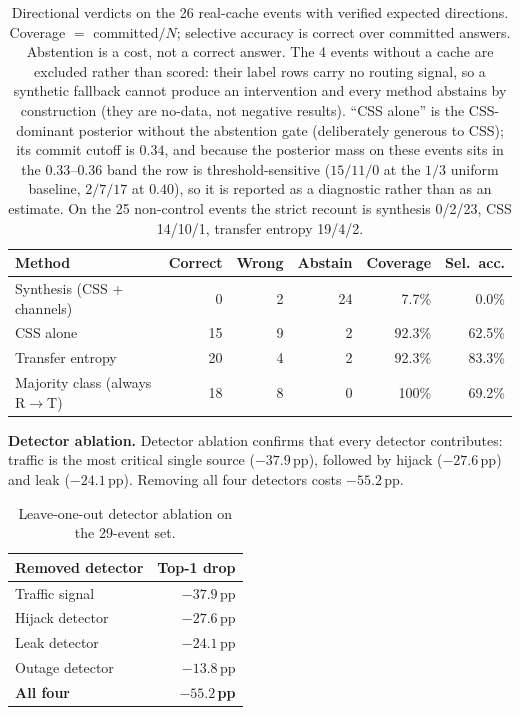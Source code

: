 \begin{table}[t]
\centering
\caption{Directional verdicts on the 26 real-cache events with verified expected directions. Coverage $=$ committed$/N$; selective accuracy is correct over committed answers. Abstention is a cost, not a correct answer. The 4 events without a cache are excluded rather than scored: their label rows carry no routing signal, so a synthetic fallback cannot produce an intervention and every method abstains by construction (they are no-data, not negative results). ``CSS alone'' is the CSS-dominant posterior without the abstention gate (deliberately generous to CSS); its commit cutoff is $0.34$, and because the posterior mass on these events sits in the $0.33$--$0.36$ band the row is threshold-sensitive ($15/11/0$ at the $1/3$ uniform baseline, $2/7/17$ at $0.40$), so it is reported as a diagnostic rather than as an estimate. On the 25 non-control events the strict recount is synthesis 0/2/23, CSS 14/10/1, transfer entropy 19/4/2.}
\label{tab:hcaf-4way}
\small
\begin{tabular}{l r r r r r}
\hline
\textbf{Method} & \textbf{Correct} & \textbf{Wrong} & \textbf{Abstain} & \textbf{Coverage} & \textbf{Sel.\ acc.} \\
\hline
Synthesis (CSS + channels) & 0  & 2 & 24 & 7.7\%  & 0.0\% \\
CSS alone                  & 15 & 9 & 2  & 92.3\% & 62.5\% \\
Transfer entropy           & 20 & 4 & 2  & 92.3\% & 83.3\% \\
Majority class (always R$\to$T) & 18 & 8 & 0 & 100\% & 69.2\% \\
\hline
\end{tabular}
\end{table}

\textbf{Detector ablation.} Detector ablation confirms that every detector contributes: traffic is the most critical single source ($-37.9$\,pp), followed by hijack ($-27.6$\,pp) and leak ($-24.1$\,pp). Removing all four detectors costs $-55.2$\,pp.

\begin{table}[t]
\centering
\caption{Leave-one-out detector ablation on the 29-event set.}
\label{tab:ablation}
\small
\begin{tabular}{l r}
\hline
\textbf{Removed detector} & \textbf{Top-1 drop} \\
\hline
Traffic signal & $-37.9$\,pp \\
Hijack detector & $-27.6$\,pp \\
Leak detector & $-24.1$\,pp \\
Outage detector & $-13.8$\,pp \\
\hline
\textbf{All four} & \textbf{$-55.2$\,pp} \\
\hline
\end{tabular}
\end{table}

